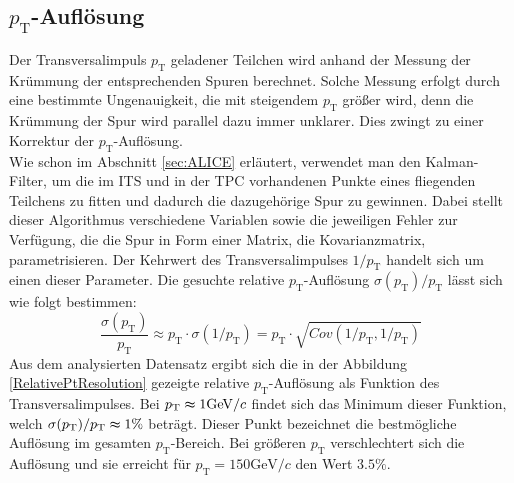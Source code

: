 \documentclass[12pt,a4paper]{report}
\begin{document}
\subsection{$p_{\mathrm{T}}$-Auflösung}
Der Transversalimpuls $p_{\mathrm{T}}$ geladener Teilchen wird anhand der Messung der Krümmung der entsprechenden Spuren berechnet. Solche Messung erfolgt durch eine bestimmte Ungenauigkeit, die mit steigendem $p_{\mathrm{T}}$ größer wird, denn die Krümmung der Spur wird parallel dazu immer unklarer. Dies zwingt zu einer Korrektur der $p_{\mathrm{T}}$-Auflösung.\\
Wie schon im Abschnitt \ref{sec:ALICE} erläutert, verwendet man den Kalman-Filter, um die im ITS und in der TPC vorhandenen Punkte eines fliegenden Teilchens zu fitten und dadurch die dazugehörige Spur zu gewinnen. Dabei stellt dieser Algorithmus verschiedene Variablen sowie die jeweiligen Fehler zur Verfügung, die die Spur in Form einer Matrix, die Kovarianzmatrix, parametrisieren. Der Kehrwert des Transversalimpulses $1/p_{\mathrm{T}}$ handelt sich um einen dieser Parameter. Die gesuchte relative $p_{\mathrm{T}}$-Auflösung $\sigma(p_{\mathrm{T}})/p_{\mathrm{T}}$ lässt sich wie folgt bestimmen:
\begin{equation} \label{eq:RelativePtResolution}
  \dfrac{\sigma(p_{\mathrm{T}})}{p_{\mathrm{T}}} \approx p_{\mathrm{T}} \cdot \sigma(1/p_{\mathrm{T}})= p_{\mathrm{T}} \cdot \sqrt{Cov(1/p_{\mathrm{T}}, 1/p_{\mathrm{T}})}
\end{equation}
Aus dem analysierten Datensatz ergibt sich die in der Abbildung \ref{RelativePtResolution} gezeigte relative $p_{\mathrm{T}}$-Auflösung als Funktion des Transversalimpulses. Bei $p_{\mathrm{T}} \thickapprox 1 \mathrm{GeV}/c$ findet sich das Minimum dieser Funktion, welch $\sigma(p_{\mathrm{T}})/p_{\mathrm{T}} \thickapprox 1\%$ beträgt. Dieser Punkt bezeichnet die bestmögliche Auflösung im gesamten $p_{\mathrm{T}}$-Bereich. Bei größeren $p_{\mathrm{T}}$ verschlechtert sich die Auflösung und sie erreicht für $p_{\mathrm{T}}=150 \mathrm{GeV}/c$ den Wert $3.5 \%$.
\end{document}

